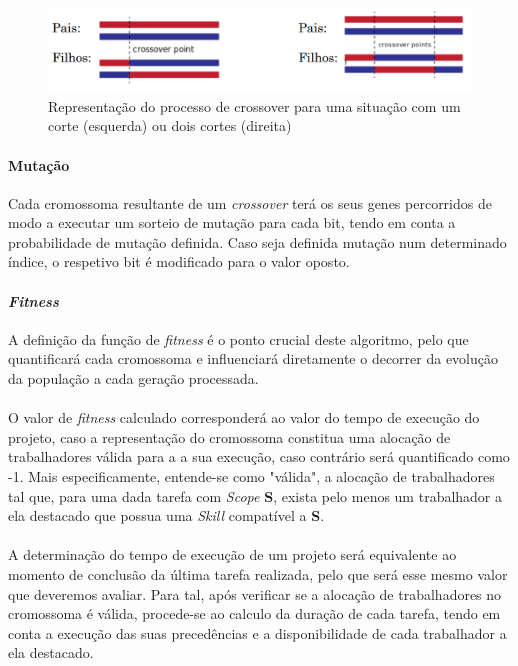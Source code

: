 \documentclass[a4paper]{article}
\begin{document}
\paragraph{}
\begin{figure}[!ht]
	\centering
	\includegraphics[scale=0.5]{crossover.png}
	\caption{Representação do processo de crossover para uma situação com um corte (esquerda) ou dois cortes (direita)}
\end{figure}
\paragraph{Mutação}
Cada cromossoma resultante de um \textit{crossover} terá os seus genes percorridos de modo a executar um sorteio de mutação para cada bit, tendo em conta a probabilidade de mutação definida. Caso seja definida mutação num determinado índice, o respetivo bit é modificado para o valor oposto.
\paragraph{\textit{Fitness}}
A definição da função de \textit{fitness} é o ponto crucial deste algoritmo, pelo que quantificará cada cromossoma e influenciará diretamente o decorrer da evolução da população a cada geração processada.
\paragraph{}
O valor de \textit{fitness} calculado corresponderá ao valor do tempo de execução do projeto, caso a representação do cromossoma constitua uma alocação de trabalhadores válida para a a sua execução, caso contrário será quantificado como -1. Mais especificamente, entende-se como "válida", a alocação de trabalhadores tal que, para uma dada tarefa com \textit{Scope} \textbf{S}, exista pelo menos um trabalhador a ela destacado que possua uma \textit{Skill} compatível a \textbf{S}.
\paragraph{}
A determinação do tempo de execução de um projeto será equivalente ao momento de conclusão da última tarefa realizada, pelo que será esse mesmo valor que deveremos avaliar. Para tal, após verificar se a alocação de trabalhadores no cromossoma é válida, procede-se ao calculo da duração de cada tarefa, tendo em conta a execução das suas precedências e a disponibilidade de cada trabalhador a ela destacado.
\end{document}
